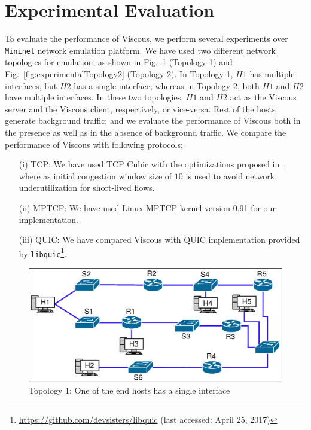 \section{Experimental Evaluation}

To evaluate the performance of Viscous, we perform several experiments over \texttt{Mininet} network emulation platform. We have used two different network topologies for emulation, as shown in Fig.~\ref{fig:experimentalTopology1} (Topology-1) and Fig.~\ref{fig:experimentalTopology2} (Topology-2). In Topology-1, $H1$ has multiple interfaces, but $H2$ has a single interface; whereas in Topology-2, both $H1$ and $H2$ have multiple interfaces. In these two topologies, $H1$ and $H2$ act as the Viscous server and the Viscous client, respectively, or vice-versa. Rest of the hosts generate background traffic; and we evaluate the performance of Viscous both in the presence as well as in the absence of background traffic.  We compare the performance of Viscous with following protocols;
\begin{enumerate}
	\item[(i)] TCP: We have used TCP Cubic with the optimizations proposed in~\cite{google-long-initcwnd}, where as initial congestion window size of $10$ is used to avoid network underutilization for short-lived flows. 
	\item[(ii)] MPTCP: We have used Linux MPTCP kernel version 0.91 for our implementation.
	\item [(iii)] QUIC: We have compared Viscous with QUIC implementation provided by \texttt{libquic}\footnote{\url{https://github.com/devsisters/libquic} (last accessed: April 25, 2017)}. 
\end{enumerate}

\begin{figure}[!ht]
	\centering
	\includegraphics[width=0.7\linewidth]{img/experimentalTopology1}
	\caption{Topology 1: One of the end hosts has a single interface}
	\label{fig:experimentalTopology1}
\end{figure}

